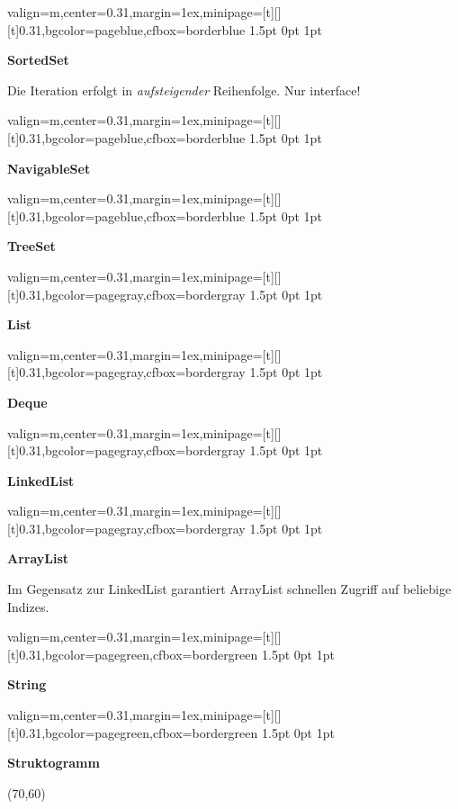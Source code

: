 \documentclass[11pt, a4paper, landscape]{article}
\newcommand{\fancyheader}[1]{
	\centerline{\sffamily \textbf{ \large #1}}
}
\newenvironment{fancybox}[2]
{
	\begin{adjustbox}{valign=m,center=0.31\textwidth,margin=1ex,minipage=[t][][t]{0.31\textwidth},bgcolor=#1,cfbox=#2 1.5pt 0pt 1pt}
	\begin{centering}
}
{
	\end{centering}
	\end{adjustbox}
}
\begin{document}
\begin{multicols}{3}
\begin{fancybox}{pageblue}{borderblue}
\fancyheader{SortedSet}


\raggedright{
	Die Iteration erfolgt in \emph{aufsteigender} Reihenfolge. Nur interface!
}
\end{fancybox}

\begin{fancybox}{pageblue}{borderblue}
\fancyheader{NavigableSet}

\end{fancybox}

\begin{fancybox}{pageblue}{borderblue}
\fancyheader{TreeSet}

\end{fancybox}

\begin{fancybox}{pagegray}{bordergray}
\fancyheader{List}

\end{fancybox}

\begin{fancybox}{pagegray}{bordergray}
\fancyheader{Deque}

\end{fancybox}

\begin{fancybox}{pagegray}{bordergray}
\fancyheader{LinkedList}

\end{fancybox}

\begin{fancybox}{pagegray}{bordergray}
\fancyheader{ArrayList}

\raggedright{
	Im Gegensatz zur LinkedList garantiert ArrayList schnellen Zugriff auf beliebige Indizes.
}
\end{fancybox}

\begin{fancybox}{pagegreen}{bordergreen}
\fancyheader{String}

\end{fancybox}

\begin{fancybox}{pagegreen}{bordergreen}
\fancyheader{Struktogramm}

\begin{struktogramm}(70,60)
			\change
		\ifend
		\change
	\ifend
\end{struktogramm}

\end{fancybox}


\end{multicols}
\end{document}
